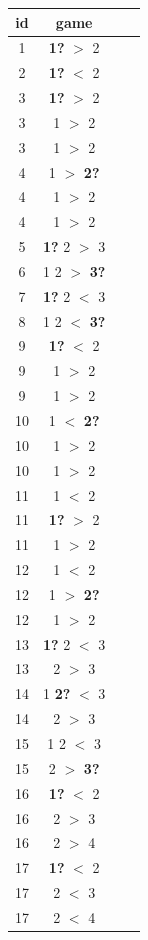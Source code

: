 \documentclass[11pt]{article}
\begin{document}
{\begin{longtable}{cccc}
  \toprule
 id & game \\
  \midrule
  \endhead
  1 & \textbf{1?} $>$ 2 \\ 
  \midrule
    2 & \textbf{1?} $<$ 2 \\ 
    \midrule
    3 & \textbf{1?} $>$ 2 \\ 
    3 & 1 $>$ 2 \\ 
    3 & 1 $>$ 2\\ 
    \midrule
    4 & 1 $>$ \textbf{2?} \\ 
    4 & 1 $>$ 2 \\ 
    4 & 1 $>$ 2
 \\ 
 \midrule
    5 & \textbf{1?} 2 $>$ 3 \\ 
    \midrule
    6 & 1 2 $>$ \textbf{3?} \\ 
    \midrule
    7 & \textbf{1?} 2 $<$ 3 \\ 
    \midrule
    8 & 1 2 $<$ \textbf{3?} \\ 
    \midrule
    9 & \textbf{1?} $<$ 2 \\ 
    9 & 1 $>$ 2 \\ 
    9 & 1 $>$ 2
 \\ 
 \midrule
   10 & 1 $<$ \textbf{2?} \\ 
   10 & 1 $>$ 2 \\ 
   10 & 1 $>$ 2
 \\ 
 \midrule
   11 & 1 $<$ 2 \\ 
   11 & \textbf{1?} $>$ 2 \\ 
   11 & 1 $>$ 2
 \\ 
 \midrule
   12 & 1 $<$ 2 \\ 
   12 & 1 $>$ \textbf{2?} \\ 
   12 & 1 $>$ 2
 \\ 
 \midrule
   13 & \textbf{1?} 2 $<$ 3 \\ 
   13 & 2 $>$ 3 \\ 
   \midrule
   14 & 1 \textbf{2?} $<$ 3 \\ 
   14 & 2 $>$ 3 \\ 
   \midrule
   15 & 1 2 $<$ 3 \\ 
   15 & 2 $>$ \textbf{3?} \\ 
   \midrule
   16 & \textbf{1?} $<$ 2 \\ 
   16 & 2 $>$ 3 \\ 
   16 & 2 $>$ 4
 \\ 
 \midrule
   17 & \textbf{1?} $<$ 2 \\ 
   17 & 2 $<$ 3 \\ 
   17 & 2 $<$ 4
 \\ 

\end{longtable}}
\end{document}
